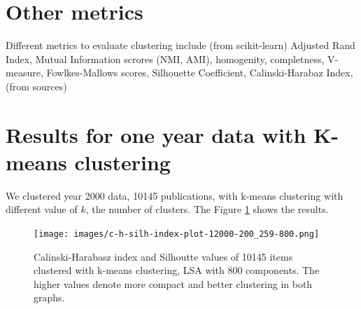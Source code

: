 \section{Other metrics}
Different metrics to evaluate clustering include (from 
scikit-learn) Adjusted Rand Index, Mutual Information scrores 
(NMI, AMI), homogenity, completness, V-measure, Fowlkes-Mallows 
scores, Silhouette Coefficient, Calinski-Harabaz Index, (from 
sources) 


\section{Results for one year data with K-means clustering}
We clustered year 2000 data, 10145 publications, with k-means 
clustering with different value of $k$, the number of clusters. 
The Figure \ref{fig:ch-silh02} shows the results.
\begin{figure}[ht]
  \begin{center}    
\texttt{[image: images/c-h-silh-index-plot-12000-200\_259-800.png]}
    \caption{Calinski-Harabasz index and Silhoutte values of 
10145 items clustered with k-means clustering, LSA with 800 
components. The higher values denote more compact and better 
clustering in both graphs.}
    \label{fig:ch-silh02}
  \end{center}
\end{figure}


